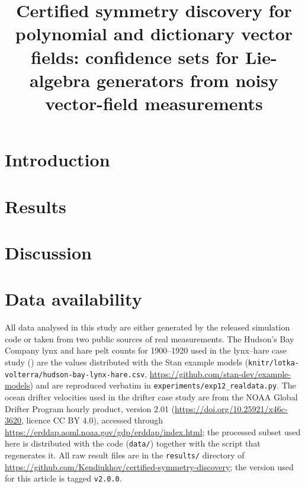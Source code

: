 \documentclass[pdflatex,sn-nature,lineno]{sn-jnl}
\theoremstyle{plain}
\theoremstyle{definition}
\begin{document}
\title[Certified symmetry discovery]{Certified symmetry discovery for polynomial
and dictionary vector fields: confidence sets for Lie-algebra generators from
noisy vector-field measurements}

\author*[1]{ }


\abstract{}


\maketitle

\raggedright

\section{Introduction}


\section{Results}






\FloatBarrier
\section{Discussion}




\section*{Data availability}

All data analysed in this study are either generated by the released
simulation code or taken from two public sources of real measurements. The
Hudson's Bay Company lynx and hare pelt counts for 1900--1920 used in the
lynx--hare case study (\SNrealdata) are the values distributed with the Stan
example models (\texttt{knitr/lotka-volterra/hudson-bay-lynx-hare.csv},
\url{https://github.com/stan-dev/example-models}) and are reproduced verbatim in
\texttt{experiments/exp12\_realdata.py}. The ocean drifter velocities used in
the drifter case study are from
the NOAA Global Drifter Program hourly product, version 2.01
(\url{https://doi.org/10.25921/x46c-3620}, licence CC BY 4.0), accessed through
\url{https://erddap.aoml.noaa.gov/gdp/erddap/index.html}; the processed subset
used here is distributed with the code (\texttt{data/}) together with the
script that regenerates it. All raw result files are in the
\texttt{results/} directory of
\url{https://github.com/Kendiukhov/certified-symmetry-discovery}; the version
used for this article is tagged \texttt{v2.0.0}.
\end{document}
